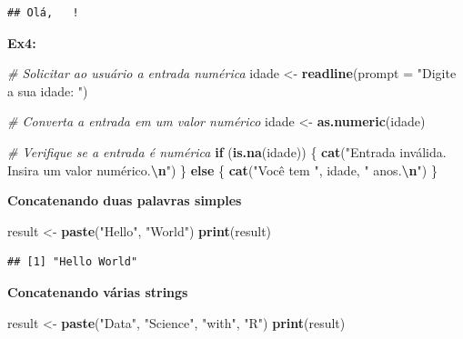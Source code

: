 \documentclass[
]{book}
\newenvironment{Shaded}{\begin{snugshade}}{\end{snugshade}}
\newcommand{\AttributeTok}[1]{\textcolor[rgb]{0.13,0.29,0.53}{#1}}
\newcommand{\CommentTok}[1]{\textcolor[rgb]{0.56,0.35,0.01}{\textit{#1}}}
\newcommand{\ControlFlowTok}[1]{\textcolor[rgb]{0.13,0.29,0.53}{\textbf{#1}}}
\newcommand{\FunctionTok}[1]{\textcolor[rgb]{0.13,0.29,0.53}{\textbf{#1}}}
\newcommand{\NormalTok}[1]{#1}
\newcommand{\OtherTok}[1]{\textcolor[rgb]{0.56,0.35,0.01}{#1}}
\newcommand{\SpecialCharTok}[1]{\textcolor[rgb]{0.81,0.36,0.00}{\textbf{#1}}}
\newcommand{\StringTok}[1]{\textcolor[rgb]{0.31,0.60,0.02}{#1}}
\theoremstyle{definition}
\theoremstyle{definition}
\theoremstyle{definition}
\theoremstyle{definition}
\theoremstyle{remark}
\begin{document}
\begin{verbatim}
## Olá,   !
\end{verbatim}

\textbf{Ex4:}

\begin{Shaded}
\begin{Highlighting}[]
\CommentTok{\# Solicitar ao usuário a entrada numérica}
\NormalTok{idade }\OtherTok{\textless{}{-}} \FunctionTok{readline}\NormalTok{(}\AttributeTok{prompt =} \StringTok{"Digite a sua idade: "}\NormalTok{)}
    
\CommentTok{\# Converta a entrada em um valor numérico}
\NormalTok{idade }\OtherTok{\textless{}{-}} \FunctionTok{as.numeric}\NormalTok{(idade)}
    
\CommentTok{\# Verifique se a entrada é numérica}
\ControlFlowTok{if}\NormalTok{ (}\FunctionTok{is.na}\NormalTok{(idade)) \{}
\FunctionTok{cat}\NormalTok{(}\StringTok{"Entrada inválida. Insira um valor numérico.}\SpecialCharTok{\textbackslash{}n}\StringTok{"}\NormalTok{)}
\NormalTok{\} }\ControlFlowTok{else}\NormalTok{ \{}
  \FunctionTok{cat}\NormalTok{(}\StringTok{"Você tem "}\NormalTok{, idade, }\StringTok{" anos.}\SpecialCharTok{\textbackslash{}n}\StringTok{"}\NormalTok{)}
\NormalTok{\}}
\end{Highlighting}
\end{Shaded}

\textbf{Concatenando duas palavras simples}

\begin{Shaded}
\begin{Highlighting}[]
\NormalTok{result }\OtherTok{\textless{}{-}} \FunctionTok{paste}\NormalTok{(}\StringTok{"Hello"}\NormalTok{, }\StringTok{"World"}\NormalTok{)}
\FunctionTok{print}\NormalTok{(result)}
\end{Highlighting}
\end{Shaded}

\begin{verbatim}
## [1] "Hello World"
\end{verbatim}

\textbf{Concatenando várias strings}

\begin{Shaded}
\begin{Highlighting}[]
\NormalTok{result }\OtherTok{\textless{}{-}} \FunctionTok{paste}\NormalTok{(}\StringTok{"Data"}\NormalTok{, }\StringTok{"Science"}\NormalTok{, }\StringTok{"with"}\NormalTok{, }\StringTok{"R"}\NormalTok{)}
\FunctionTok{print}\NormalTok{(result)}
\end{Highlighting}
\end{Shaded}
\end{document}
